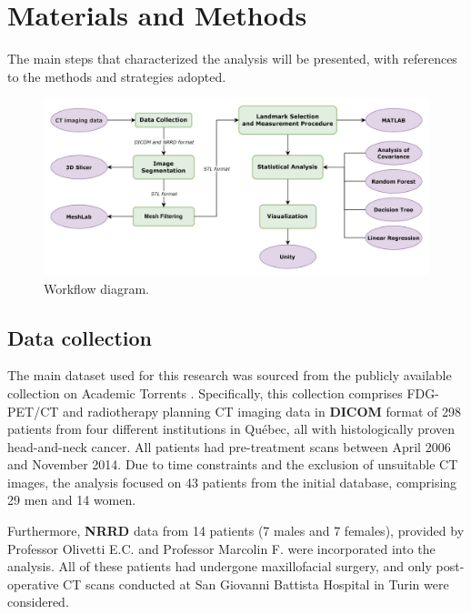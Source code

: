 \documentclass[journal,article,submit,pdftex,moreauthors]{Definitions/mdpi}
\begin{document}
\section{Materials and Methods}
\label{sec:matmet}
The main steps that characterized the analysis will be presented, with references to the methods and strategies adopted.
\vspace{-0.35cm}
\begin{figure}[H]
\centering
\begin{minipage}{0.87\textwidth}
\centering
\includegraphics[width=\linewidth]{Definitions/diagramma.jpg}
\vspace{-1.1cm}
\caption{Workflow diagram.}
\label{fig1}
\end{minipage}
\end{figure}



\subsection{Data collection}

The main dataset used for this research was sourced from the publicly available collection on Academic Torrents \cite{ref27}. Specifically, this collection comprises FDG-PET/CT and radiotherapy planning CT imaging data in \textbf{DICOM} format of 298 patients from four different institutions in Québec, all with histologically proven head-and-neck cancer. All patients had pre-treatment scans between April 2006 and November 2014. Due to time constraints and the exclusion of unsuitable CT images, the analysis focused on 43 patients from the initial database, comprising 29 men and 14 women.

Furthermore, \textbf{NRRD} data from 14 patients (7 males and 7 females), provided by Professor Olivetti E.C. and Professor Marcolin F. were incorporated into the analysis. All of these patients had undergone maxillofacial surgery, and only post-operative CT scans conducted at San Giovanni Battista Hospital in Turin were considered.
\end{document}

